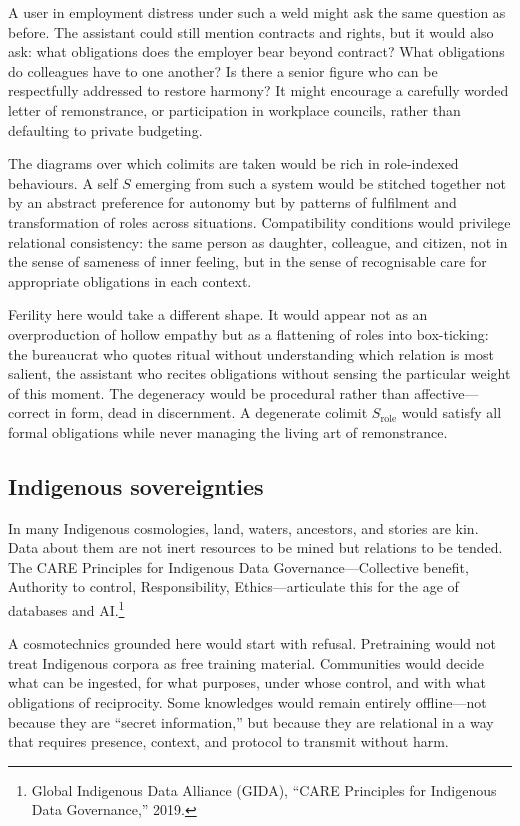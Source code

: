 \documentclass[12pt,a4paper]{article}
\begin{document}
A user in employment distress under such a weld might ask the same question as before. The assistant could still mention contracts and rights, but it would also ask: what obligations does the employer bear beyond contract? What obligations do colleagues have to one another? Is there a senior figure who can be respectfully addressed to restore harmony? It might encourage a carefully worded letter of remonstrance, or participation in workplace councils, rather than defaulting to private budgeting.

The diagrams over which colimits are taken would be rich in role-indexed behaviours. A self $S$ emerging from such a system would be stitched together not by an abstract preference for autonomy but by patterns of fulfilment and transformation of roles across situations. Compatibility conditions would privilege relational consistency: the same person as daughter, colleague, and citizen, not in the sense of sameness of inner feeling, but in the sense of recognisable care for appropriate obligations in each context.

Ferility here would take a different shape. It would appear not as an overproduction of hollow empathy but as a flattening of roles into box-ticking: the bureaucrat who quotes ritual without understanding which relation is most salient, the assistant who recites obligations without sensing the particular weight of this moment. The degeneracy would be procedural rather than affective---correct in form, dead in discernment. A degenerate colimit $S_{\text{role}}$ would satisfy all formal obligations while never managing the living art of remonstrance.

\subsection{Indigenous sovereignties}

In many Indigenous cosmologies, land, waters, ancestors, and stories are kin. Data about them are not inert resources to be mined but relations to be tended. The CARE Principles for Indigenous Data Governance---Collective benefit, Authority to control, Responsibility, Ethics---articulate this for the age of databases and AI.\footnote{Global Indigenous Data Alliance (GIDA), ``CARE Principles for Indigenous Data Governance,'' 2019.}

A cosmotechnics grounded here would start with refusal. Pretraining would not treat Indigenous corpora as free training material. Communities would decide what can be ingested, for what purposes, under whose control, and with what obligations of reciprocity. Some knowledges would remain entirely offline---not because they are ``secret information,'' but because they are relational in a way that requires presence, context, and protocol to transmit without harm.
\end{document}
